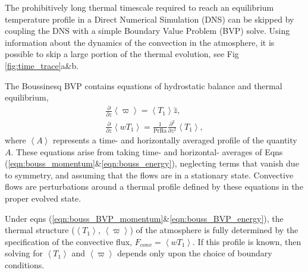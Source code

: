 \documentclass[aps, pre, onecolumn, nofootinbib, notitlepage, groupedaddress, amsfonts, amssymb, amsmath, longbibliography]{revtex4-1}
\newcommand{\angles}[1]{\ensuremath{\left\langle #1 \right\rangle}}
\begin{document}
The prohibitively long thermal timescale required to reach an equilibrium temperature profile
in a Direct Numerical Simulation (DNS) can be skipped by coupling the DNS with a simple Boundary Value Problem
(BVP) solve. Using information about the dynamics of the convection in the atmosphere, it is possible
to skip a large portion of the thermal evolution, see Fig \ref{fig:time_trace}a\&b.

The Boussinesq BVP contains equations of hydrostatic balance and thermal equilibrium,
\begin{gather}
\frac{\partial}{\partial z}\angles{\varpi} = \angles{T_1}\hat{z},
	\label{eqn:bouss_BVP_momentum}
\\
\frac{\partial}{\partial z}\angles{wT_1} = \frac{1}{\text{Pr}\text{Ra}}\frac{\partial^2}{\partial z^2} \angles{T_1},
	\label{eqn:bouss_BVP_energy}
\end{gather}
where $\angles{A}$ represents a time- and horizontally averaged profile of the quantity $A$.  
These
equations arise from taking time- and horizontal- averages of Eqns (\ref{eqn:bouss_momentum}\&\ref{eqn:bouss_energy}),
neglecting terms that vanish due to symmetry, and assuming that the flows are in a stationary state.  
Convective flows
are perturbations around a thermal profile defined by these equations in the proper evolved state.

Under eqns (\ref{eqn:bouss_BVP_momentum}\&\ref{eqn:bouss_BVP_energy}), 
the thermal structure ($\angles{T_1}$, $\angles{\varpi}$) of the atmosphere is fully determined by the specification
of the convective flux, $F_{conv} = \angles{w T_1}$.  If this profile is known, then 
solving for $\angles{T_1}$ and
$\angles{\varpi}$ depends only upon the choice of boundary conditions.
\end{document}
